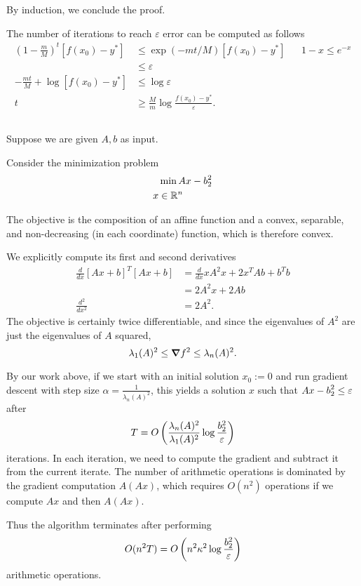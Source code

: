 \documentclass[10pt]{article}
\let\norm\relax
\DeclarePairedDelimiter{\norm}{\lVert}{\rVert}
\newcommand{\R}{\mathbb{R}}
\begin{document}
By induction,
we conclude the proof.

The number of iterations to reach $\varepsilon$ error can be computed as follows
\begin{align*}
  \left( 1-\frac{m}M \right)^t [f(x_0) - y^*]
  &\leq \exp(-mt/M) [f(x_0) - y^*] &&1-x\leq e^{-x} \\
  &\leq \varepsilon \\
  -\frac{mt}{M} + \log[f(x_0) - y^*] &\leq \log \varepsilon \\
  t &\geq \frac{M}{m} \log\frac{f(x_0) - y^*}{\varepsilon}.
\end{align*}

\subsection{}
Suppose we are given $A, b$ as input.

Consider the minimization problem
\begin{align*}
  &\min \norm{Ax - b}_2^2 \\
  x &\in \R^n
\end{align*}

The objective is the composition of an affine function
and a convex, separable, and non-decreasing (in each coordinate) function,
which is therefore convex.

We explicitly compute its first and second derivatives
\begin{align*}
  \frac{d}{dx} [Ax+b]^T[Ax + b]
  &= \frac{d}{dx} xA^2x + 2x^TAb + b^Tb \\
  &= 2 A^2x + 2Ab \\
  \frac{d^2}{dx^2}
  &= 2A^2.
\end{align*}
The objective is certainly twice differentiable,
and since the eigenvalues of $A^2$ are just the eigenvalues of $A$ squared,
\[
  \lambda_1(A)^2 \leq \grad f^2 \leq \lambda_n(A)^2.
\]

By our work above,
if we start with an initial solution $x_0 := 0$
and run gradient descent with step size $\alpha = \frac1{\lambda_n(A)^2}$,
this yields a solution $x$ such that $\norm{Ax-b}_2^2 \leq \varepsilon$ after
\[
  T = O\left( \frac{\lambda_n(A)^2}{\lambda_1(A)^2} \log\frac{\norm{b}_2^2}{\varepsilon} \right)
\]
iterations.
In each iteration,
we need to compute the gradient and subtract it from the current iterate.
The number of arithmetic operations is dominated by the gradient computation $A(Ax)$,
which requires $O(n^2)$ operations if we compute $Ax$ and then $A(Ax)$.

Thus the algorithm terminates after performing
\[
  O(n^2 T)
  = O\left( n^2 \kappa^2 \log \frac{\norm{b}_2^2}{\varepsilon} \right)
\]
arithmetic operations.

\clearpage
\section{}
\end{document}
